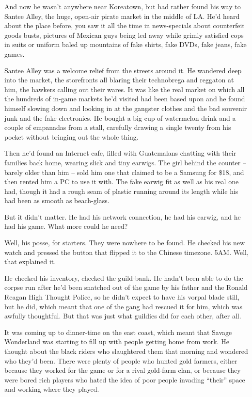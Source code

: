 And now he wasn't anywhere near Koreatown, but had rather found his
way to Santee Alley, the huge, open-air pirate market in the middle
of LA. He'd heard about the place before, you saw it all the time
in news-specials about counterfeit goods busts, pictures of Mexican
guys being led away while grimly satisfied cops in suits or uniform
baled up mountains of fake shirts, fake DVDs, fake jeans, fake
games.

Santee Alley was a welcome relief from the streets around it. He
wandered deep into the market, the storefronts all blaring their
technobrega and reggaton at him, the hawkers calling out their
wares. It was like the real market on which all the hundreds of
in-game markets he'd visited had been based upon and he found
himself slowing down and looking in at the gangster clothes and the
bad souvenir junk and the fake electronics. He bought a big cup of
watermelon drink and a couple of empanadas from a stall, carefully
drawing a single twenty from his pocket without bringing out the
whole thing.

Then he'd found an Internet cafe, filled with Guatemalans chatting
with their families back home, wearing slick and tiny earwigs. The
girl behind the counter -- barely older than him -- sold him one
that claimed to be a Samsung for \$18, and then rented him a PC to
use it with. The fake earwig fit as well as his real one had,
though it had a rough seam of plastic running around its length
while his had been as smooth as beach-glass.

But it didn't matter. He had his network connection, he had his
earwig, and he had his game. What more could he need?

Well, his posse, for starters. They were nowhere to be found. He
checked his new watch and pressed the button that flipped it to the
Chinese timezone. 5AM. Well, that explained it.

He checked his inventory, checked the guild-bank. He hadn't been
able to do the corpse run after he'd been snatched out of the game
by his father and the Ronald Reagan High Thought Police, so he
didn't expect to have his vorpal blade still, but he did, which
meant that one of the gang had rescued it for him, which was
awfully thoughtful. But that was just what guildies did for each
other, after all.

It was coming up to dinner-time on the east coast, which meant that
Savage Wonderland was starting to fill up with people getting home
from work. He thought about the black riders who slaughtered them
that morning and wondered who they'd been. There were plenty of
people who hunted gold farmers, either because they worked for the
game or for a rival gold-farm clan, or because they were bored rich
players who hated the idea of poor people invading ``their'' space
and working where they played.


